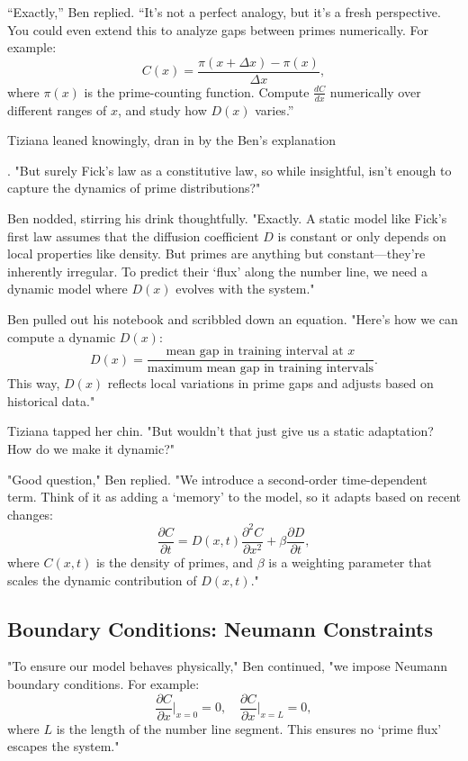 “Exactly,” Ben replied. “It’s not a perfect analogy, but it’s a fresh perspective. You could even extend this to analyze gaps between primes numerically. For example:
\[
C(x) = \frac{\pi(x+\Delta x) - \pi(x)}{\Delta x},
\]
where \(\pi(x)\) is the prime-counting function. Compute \(\frac{dC}{dx}\) numerically over different ranges of \(x\), and study how \(D(x)\) varies.”


Tiziana leaned knowingly, dran in by the Ben’s explanation

. "But surely Fick’s law as a constitutive law, so while insightful, isn’t enough to capture the dynamics of prime distributions?"

Ben nodded, stirring his drink thoughtfully. "Exactly. A static model like Fick’s first law assumes that the diffusion coefficient \(D\) is constant or only depends on local properties like density. But primes are anything but constant—they’re inherently irregular. To predict their ‘flux’ along the number line, we need a dynamic model where \(D(x)\) evolves with the system."

Ben pulled out his notebook and scribbled down an equation. "Here’s how we can compute a dynamic \(D(x)\):
\[
D(x) = \frac{\text{mean gap in training interval at } x}{\text{maximum mean gap in training intervals}}.
\]
This way, \(D(x)\) reflects local variations in prime gaps and adjusts based on historical data."

Tiziana tapped her chin. "But wouldn’t that just give us a static adaptation? How do we make it dynamic?"

"Good question," Ben replied. "We introduce a second-order time-dependent term. Think of it as adding a ‘memory’ to the model, so it adapts based on recent changes:
\[
\frac{\partial C}{\partial t} = D(x, t) \frac{\partial^2 C}{\partial x^2} + \beta \frac{\partial D}{\partial t},
\]
where \(C(x, t)\) is the density of primes, and \(\beta\) is a weighting parameter that scales the dynamic contribution of \(D(x, t)\)."

\subsection*{Boundary Conditions: Neumann Constraints}

"To ensure our model behaves physically," Ben continued, "we impose Neumann boundary conditions. For example:
\[
\frac{\partial C}{\partial x} \bigg|_{x=0} = 0, \quad \frac{\partial C}{\partial x} \bigg|_{x=L} = 0,
\]
where \(L\) is the length of the number line segment. This ensures no ‘prime flux’ escapes the system."

